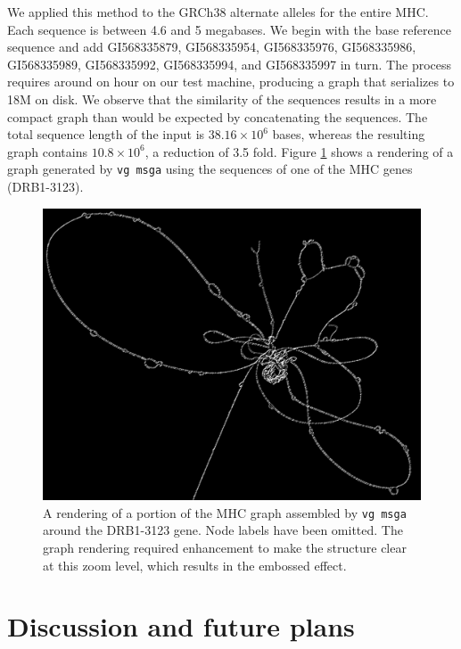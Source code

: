 \documentclass[12pt]{article}
\begin{document}
We applied this method to the GRCh38 alternate alleles for the entire MHC.
Each sequence is between 4.6 and 5 megabases.
We begin with the base reference sequence and add GI568335879, GI568335954, GI568335976, GI568335986, GI568335989, GI568335992, GI568335994, and GI568335997 in turn.
The process requires around on hour on our test machine, producing a graph that serializes to 18M on disk.
We observe that the similarity of the sequences results in a more compact graph than would be expected by concatenating the sequences.
The total sequence length of the input is $38.16 \times 10^6$ bases, whereas the resulting graph contains $10.8 \times 10^6$, a reduction of 3.5 fold.
Figure \ref{fig:DRB1-3123} shows a rendering of a graph generated by {\tt vg msga} using the sequences of one of the MHC genes (DRB1-3123).


\begin{figure}[t]
\centering
\includegraphics[width=1.0\textwidth]{figures/DRB1-3123}
\caption{\label{fig:DRB1-3123}
  A rendering of a portion of the MHC graph assembled by {\tt vg msga} around the DRB1-3123 gene.
  Node labels have been omitted. The graph rendering required enhancement to make the structure clear at this zoom level, which results in the embossed effect.
}
\end{figure}

\section{Discussion and future plans}
\end{document}
